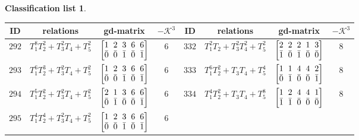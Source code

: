 \documentclass[pdftex]{sigma}%
\theoremstyle{definition}
\newtheorem{class-list}[thm]{Classification list}
\numberwithin{equation}{section}
\begin{document}
\begin{class-list}
\begin{table}[h!]\centering\setlength{\tabcolsep}{3.5pt}
\renewcommand{\arraystretch}{1.3}\small\tabulinesep=1mm
\begin{tabu}{c|c|c|c||c|c|c|c}
\hline
ID&relations&gd-matrix&$-\mathcal{K}^3$&ID&relations&gd-matrix&$-\mathcal{K}^3$
\\
\hline
${292}$&${T_{1}^{8}T_{2}^{2}+T_{3}^{2}T_{4}+T_{5}^{2}}$
&$\arraycolsep=1mm\begin{bmatrix}{1} & {2} & {3} & {6} & {6} \\ {\bar{0}} & {\bar{0}} & {\bar{1}} & {\bar{0}} & {\bar{1}}\end{bmatrix}$&${6}$
&${332}$&${T_{1}^{2}T_{2}+T_{3}^{2}T_{4}^{2}+T_{5}^{2}}$
&$\arraycolsep=1mm\begin{bmatrix}{2} & {2} & {2} & {1} & {3} \\ {\bar{1}} & {\bar{0}} & {\bar{1}} & {\bar{0}} & {\bar{0}}\end{bmatrix}$&${8}$
\\
\hline
${293}$&${T_{1}^{6}T_{2}^{3}+T_{3}^{2}T_{4}+T_{5}^{2}}$
&$\arraycolsep=1mm\begin{bmatrix}{1} & {2} & {3} & {6} & {6} \\ {\bar{0}} & {\bar{0}} & {\bar{1}} & {\bar{0}} & {\bar{1}}\end{bmatrix}$&${6}$
&${333}$&${T_{1}^{6}T_{2}^{2}+T_{3}T_{4}+T_{5}^{4}}$
&$\arraycolsep=1mm\begin{bmatrix}{1} & {1} & {4} & {4} & {2} \\ {\bar{0}} & {\bar{1}} & {\bar{0}} & {\bar{0}} & {\bar{1}}\end{bmatrix}$&${8}$
\\
\hline
${294}$&${T_{1}^{5}T_{2}^{2}+T_{3}^{2}T_{4}+T_{5}^{2}}$
&$\arraycolsep=1mm\begin{bmatrix}{2} & {1} & {3} & {6} & {6} \\ {\bar{0}} & {\bar{1}} & {\bar{0}} & {\bar{0}} & {\bar{1}}\end{bmatrix}$&${6}$
&${334}$&${T_{1}^{4}T_{2}^{2}+T_{3}T_{4}+T_{5}^{8}}$
&$\arraycolsep=1mm\begin{bmatrix}{1} & {2} & {4} & {4} & {1} \\ {\bar{1}} & {\bar{1}} & {\bar{0}} & {\bar{0}} & {\bar{0}}\end{bmatrix}$&${8}$
\\
\hline
${295}$&${T_{1}^{4}T_{2}^{4}+T_{3}^{2}T_{4}+T_{5}^{2}}$
&$\arraycolsep=1mm\begin{bmatrix}{1} & {2} & {3} & {6} & {6} \\ {\bar{0}} & {\bar{0}} & {\bar{1}} & {\bar{0}} & {\bar{1}}\end{bmatrix}$&${6}$

\end{tabu}
\end{table}
\end{class-list}
\end{document}

